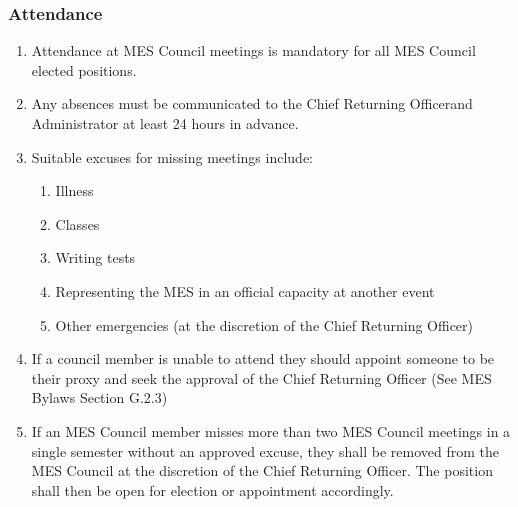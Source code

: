 \hypertarget{attendance}{%
 \subsubsection{Attendance}
 \label{attendance}}
\begin{enumerate}
 \item
  Attendance at MES Council meetings is mandatory for all MES Council
  elected positions.
 \item
  Any absences must be communicated to the Chief Returning Officerand
  Administrator at least 24 hours in advance.
 \item
  Suitable excuses for missing meetings include:

  \begin{enumerate}
   \item
    Illness
   \item
    Classes
   \item
    Writing tests
   \item
    Representing the MES in an official capacity at another event
   \item
    Other emergencies (at the discretion of the Chief Returning Officer)
  \end{enumerate}
 \item
  If a council member is unable to attend they should appoint someone to
  be their proxy and seek the approval of the Chief Returning Officer
  (See MES Bylaws Section G.2.3)
 \item
  If an MES Council member misses more than two MES Council meetings in
  a single semester without an approved excuse, they shall be removed
  from the MES Council at the discretion of the Chief Returning Officer.
  The position shall then be open for election or appointment
  accordingly.
\end{enumerate}

